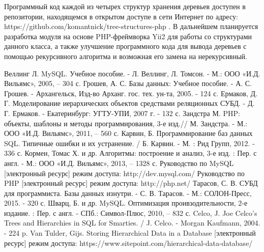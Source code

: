 \documentclass[a4paper,14pt]{extreport}
\theoremstyle{definition}
\begin{document}
Программный код каждой из четырех структур хранения деревьев доступен в репозитории, находящемся в открытом доступе в сети Интернет по адресу: https://github.com/komantnick/tree-structures-php .
В дальнейшем планируется разработка модуля на основе PHP-фреймворка Yii2 для работы со структурами данного класса, а также улучшение программного кода для вывода деревьев с помощью рекурсивного алгоритма и возможная его замена на нерекурсивный.
\begin{thebibliography}{99}
 Веллинг Л. MySQL. Учебное пособие. - Л. Веллинг, Л. Томсон. - М.: ООО «И.Д. Вильямс», 2005, – 304 с.
 Грошев, А. С. Базы данных: Учебное пособие. - А. С. Грошев. - Архангельск, Изд-во Арханг. гос. тех. ун-та, 2005. - 124 с.
 Ермаков, Д. Г. Моделирование иерархических объектов средствами реляционных СУБД. - Д. Г. Ермаков. - Екатеринбург: УГТУ-УПИ, 2007 г. - 132 с.
 Зандстра М. PHP: объекты, шаблоны и методы программирования, 3-е изд.// М. Зандстра. - М.: ООО «И.Д. Вильямс», 2011, – 560 с.
 Карвин, Б.  Программирование баз данных SQL. Типичные ошибки и их устранение. / Б. Карвин. - М. : Рид Групп, 2012. - 336 с.
 Кормен, Томас Х. и др. Алгоритмы: построение и анализ, 3-е изд. : Пер. с англ. - М.: ООО «И.Д. Вильямс», 2013, – 1328 с.
 Руководство по MySQL [электронный ресурс] режим доступа: http://dev.mysql.com/
 Руководство по PHP [электронный ресурс] режим доступа: http://php.net/
 Тарасов, С. В. СУБД для программиста. Базы данных изнутри. - С. В. Тарасов. - М.: СОЛОН-Пресс, 2015. - 320 с.
 Шварц, Б. и др. MySQL. Оптимизация проивзодительности, 2-е издание. : Пер. с англ. - СПб.: Символ-Плюс, 2010, – 832 с.
 Celco, J. Joe Celco's Trees and Hierarchies in SQL for Smarties. / J. Celco. - Morgan Kaufmann, 2004. - 224 p.
 Van Tulder, Gijs. Storing Hierarchical Data in a Database [электронный ресурс] режим доступа: https://www.sitepoint.com/hierarchical-data-database/
\end{thebibliography}
\end{document}
